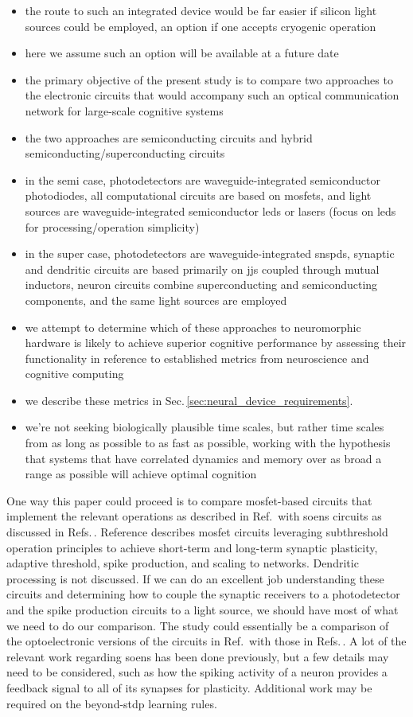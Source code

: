 \documentclass[onecolumn]{article}
\begin{document}
\begin{itemize}
\item the route to such an integrated device would be far easier if silicon light sources could be employed, an option if one accepts cryogenic operation
\item here we assume such an option will be available at a future date
\item the primary objective of the present study is to compare two approaches to the electronic circuits that would accompany such an optical communication network for large-scale cognitive systems
\item the two approaches are semiconducting circuits and hybrid semiconducting/superconducting circuits
\item in the semi case, photodetectors are waveguide-integrated semiconductor photodiodes, all computational circuits are based on mosfets, and light sources are waveguide-integrated semiconductor leds or lasers (focus on leds for processing/operation simplicity)
\item in the super case, photodetectors are waveguide-integrated snspds, synaptic and dendritic circuits are based primarily on jjs coupled through mutual inductors, neuron circuits combine superconducting and semiconducting components, and the same light sources are employed
\item we attempt to determine which of these approaches to neuromorphic hardware is likely to achieve superior cognitive performance by assessing their functionality in reference to established metrics from neuroscience and cognitive computing
\item we describe these metrics in Sec.\,\ref{sec:neural_device_requirements}.
\item we're not seeking biologically plausible time scales, but rather time scales from as long as possible to as fast as possible, working with the hypothesis that systems that have correlated dynamics and memory over as broad a range as possible will achieve optimal cognition
\end{itemize}

One way this paper could proceed is to compare mosfet-based circuits that implement the relevant operations as described in Ref.\,\cite{chst2014} with soens circuits as discussed in Refs.\,\cite{shbu2019,sh2020}. Reference \cite{chst2014} describes mosfet circuits leveraging subthreshold operation principles to achieve short-term and long-term synaptic plasticity, adaptive threshold, spike production, and scaling to networks. Dendritic processing is not discussed. If we can do an excellent job understanding these circuits and determining how to couple the synaptic receivers to a photodetector and the spike production circuits to a light source, we should have most of what we need to do our comparison. The study could essentially be a comparison of the optoelectronic versions of the circuits in Ref.\,\cite{chst2014} with those in Refs.\,\cite{shbu2019,sh2020}. A lot of the relevant work regarding soens has been done previously, but a few details may need to be considered, such as how the spiking activity of a neuron provides a feedback signal to all of its synapses for plasticity. Additional work may be required on the beyond-stdp learning rules.
\end{document}
